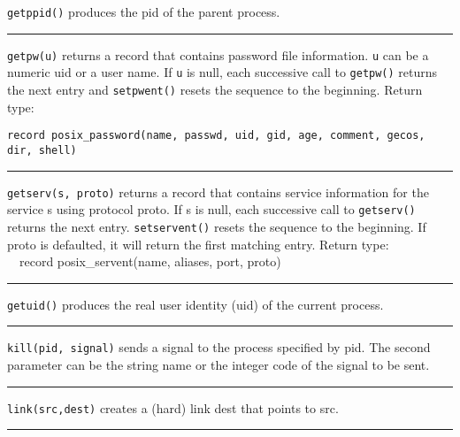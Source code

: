 \noindent
\texttt{getppid()} produces the pid of the parent process.

\bigskip\hrule\vspace{0.1cm}

\noindent
\texttt{getpw(u)} returns a record that contains password file
information. \texttt{u} can
be a numeric uid or a user name. If \texttt{u} is null, each successive call to
\texttt{getpw()} returns the next entry and \texttt{setpwent()} resets
the sequence to the beginning. Return type:

\noindent
\texttt{record posix\_password(name, passwd, uid, gid, age, comment, gecos,
dir, shell)}

\bigskip\hrule\vspace{0.1cm}

\noindent
\texttt{getserv(s, proto)} returns a record that contains service information
for the service s using protocol proto. If s is null, each successive call
to \texttt{getserv()} returns the next entry. \texttt{setservent()}
resets the sequence to the beginning.
If proto is defaulted, it will return the first matching entry. 
Return type:\\
\ \ record posix\_servent(name, aliases, port, proto) 


\bigskip\hrule\vspace{0.1cm}

\noindent
\texttt{getuid()} produces the real user identity (uid) of the current process. 

\bigskip\hrule\vspace{0.1cm}

\noindent
\texttt{kill(pid, signal)} sends a signal to the process specified by pid. The
second parameter can be the string name or the integer code of the
signal to be sent.

\bigskip\hrule\vspace{0.1cm}

\noindent
{}\texttt{link(src,dest)} creates a (hard) link dest that
points to src.

\bigskip\hrule\vspace{0.1cm}

